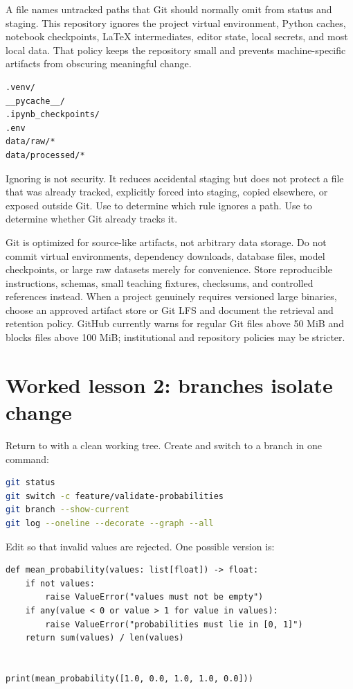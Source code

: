 A  file names untracked paths that Git should normally omit
from status and staging. This repository ignores the project virtual
environment, Python caches, notebook checkpoints, LaTeX intermediates, editor
state, local secrets, and most local data. That policy keeps the repository
small and prevents machine-specific artifacts from obscuring meaningful change.

\begin{lstlisting}[numbers=none]
.venv/
__pycache__/
.ipynb_checkpoints/
.env
data/raw/*
data/processed/*
\end{lstlisting}

Ignoring is not security. It reduces accidental staging but does not protect a
file that was already tracked, explicitly forced into staging, copied elsewhere,
or exposed outside Git. Use  to determine which
rule ignores a path. Use  to determine whether Git already
tracks it.

Git is optimized for source-like artifacts, not arbitrary data storage. Do not
commit virtual environments, dependency downloads, database files, model
checkpoints, or large raw datasets merely for convenience. Store reproducible
instructions, schemas, small teaching fixtures, checksums, and controlled
references instead. When a project genuinely requires versioned large binaries,
choose an approved artifact store or Git LFS and document the retrieval and
retention policy. GitHub currently warns for regular Git files above 50 MiB and
blocks files above 100 MiB; institutional and repository policies may be
stricter.

\section{Worked lesson 2: branches isolate change}

Return to  with a clean working tree. Create and switch to a
branch in one command:

\begin{lstlisting}[language=bash,numbers=none]
git status
git switch -c feature/validate-probabilities
git branch --show-current
git log --oneline --decorate --graph --all
\end{lstlisting}

Edit  so that invalid values are rejected. One possible
version is:

\begin{lstlisting}
def mean_probability(values: list[float]) -> float:
    if not values:
        raise ValueError("values must not be empty")
    if any(value < 0 or value > 1 for value in values):
        raise ValueError("probabilities must lie in [0, 1]")
    return sum(values) / len(values)


print(mean_probability([1.0, 0.0, 1.0, 1.0, 0.0]))
\end{lstlisting}

